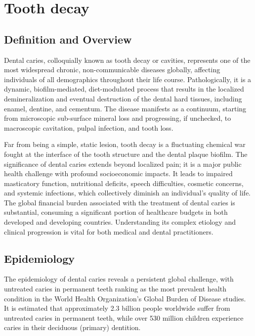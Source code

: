 \chapter{Tooth decay}

\section*{Definition and Overview}
Dental caries, colloquially known as tooth decay or cavities, represents one of the most widespread chronic, non-communicable diseases globally, affecting individuals of all demographics throughout their life course. Pathologically, it is a dynamic, biofilm-mediated, diet-modulated process that results in the localized demineralization and eventual destruction of the dental hard tissues, including enamel, dentine, and cementum. The disease manifests as a continuum, starting from microscopic sub-surface mineral loss and progressing, if unchecked, to macroscopic cavitation, pulpal infection, and tooth loss.

Far from being a simple, static lesion, tooth decay is a fluctuating chemical war fought at the interface of the tooth structure and the dental plaque biofilm. The significance of dental caries extends beyond localized pain; it is a major public health challenge with profound socioeconomic impacts. It leads to impaired masticatory function, nutritional deficits, speech difficulties, cosmetic concerns, and systemic infections, which collectively diminish an individual's quality of life. The global financial burden associated with the treatment of dental caries is substantial, consuming a significant portion of healthcare budgets in both developed and developing countries. Understanding its complex etiology and clinical progression is vital for both medical and dental practitioners.

\section*{Epidemiology}
The epidemiology of dental caries reveals a persistent global challenge, with untreated caries in permanent teeth ranking as the most prevalent health condition in the World Health Organization's Global Burden of Disease studies. It is estimated that approximately 2.3 billion people worldwide suffer from untreated caries in permanent teeth, while over 530 million children experience caries in their deciduous (primary) dentition.

